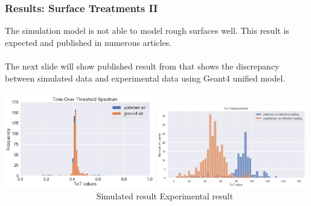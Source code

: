 \documentclass[xcolor=x11names, compress, handout]{beamer}
\renewcommand{\(}{\begin{columns}}
\renewcommand{\)}{\end{columns}}
\newcommand{\<}[1]{\begin{column}{#1}}
\renewcommand{\>}{\end{column}}
\begin{document}
\begin{frame}
\frametitle{Results: Surface Treatments II}
\scriptsize
The simulation model is not able to model rough surfaces well. This result is expected and published in numerous articles. \cite{janecek_moses_2008} \cite{janecek_moses_2010} \cite{roncali_cherry_2013} \cite{roncali_stockhoff_cherry_2017}  \\
\ \\
The next slide will show published result from \cite{janecek_moses_2010} that shows the discrepancy between simulated data and experimental data using Geant4 unified model. \\
\ \\
\centering
\includegraphics[width=0.49\textwidth, height=0.45\textheight]{images/comparison_groundair_polishedair.png}
\includegraphics[width=0.49\textwidth, height=0.45\textheight]{images/roughness1.png}
\flushleft~~~~~~~~~~~~~~~~~~~~~ Simulated result \hspace{3cm} Experimental result
\end{frame}
\end{document}
